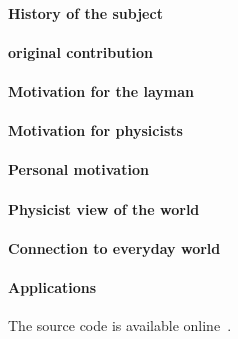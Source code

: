 \paragraph{History of the subject}


\paragraph{original contribution}

\paragraph{Motivation for the layman}
\paragraph{Motivation for physicists}
\paragraph{Personal motivation}


\paragraph{Physicist view of the world}

\paragraph{Connection to everyday world}

\paragraph{Applications}

The source code is available online~\cite{SourceCode}.

